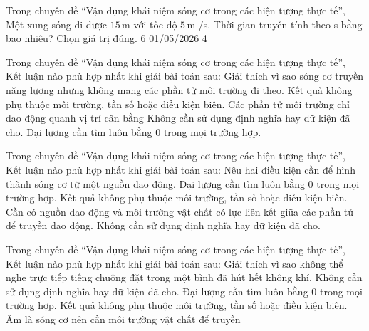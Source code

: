 \begin{ex}
Trong chuyên đề “Vận dụng khái niệm sóng cơ trong các hiện tượng thực tế”, Một xung sóng đi được $15\,\text{m}$ với tốc độ $5\,\text{m}$ /s. Thời gian truyền tính theo s bằng bao nhiêu? Chọn giá trị đúng.
\choice
{}
{6}
{01/05/2026}
{4}
\end{ex}

\begin{ex}
Trong chuyên đề “Vận dụng khái niệm sóng cơ trong các hiện tượng thực tế”, Kết luận nào phù hợp nhất khi giải bài toán sau: Giải thích vì sao sóng cơ truyền năng lượng nhưng không mang các phần tử môi trường đi theo.
\choice
{Kết quả không phụ thuộc môi trường, tần số hoặc điều kiện biên.}
{\True Các phần tử môi trường chỉ dao động quanh vị trí cân bằng}
{Không cần sử dụng định nghĩa hay dữ kiện đã cho.}
{Đại lượng cần tìm luôn bằng 0 trong mọi trường hợp.}
\end{ex}

\begin{ex}
Trong chuyên đề “Vận dụng khái niệm sóng cơ trong các hiện tượng thực tế”, Kết luận nào phù hợp nhất khi giải bài toán sau: Nêu hai điều kiện cần để hình thành sóng cơ từ một nguồn dao động.
\choice
{Đại lượng cần tìm luôn bằng 0 trong mọi trường hợp.}
{Kết quả không phụ thuộc môi trường, tần số hoặc điều kiện biên.}
{\True Cần có nguồn dao động và môi trường vật chất có lực liên kết giữa các phần tử để truyền dao động.}
{Không cần sử dụng định nghĩa hay dữ kiện đã cho.}
\end{ex}

\begin{ex}
Trong chuyên đề “Vận dụng khái niệm sóng cơ trong các hiện tượng thực tế”, Kết luận nào phù hợp nhất khi giải bài toán sau: Giải thích vì sao không thể nghe trực tiếp tiếng chuông đặt trong một bình đã hút hết không khí.
\choice
{Không cần sử dụng định nghĩa hay dữ kiện đã cho.}
{Đại lượng cần tìm luôn bằng 0 trong mọi trường hợp.}
{Kết quả không phụ thuộc môi trường, tần số hoặc điều kiện biên.}
{\True Âm là sóng cơ nên cần môi trường vật chất để truyền}
\end{ex}

